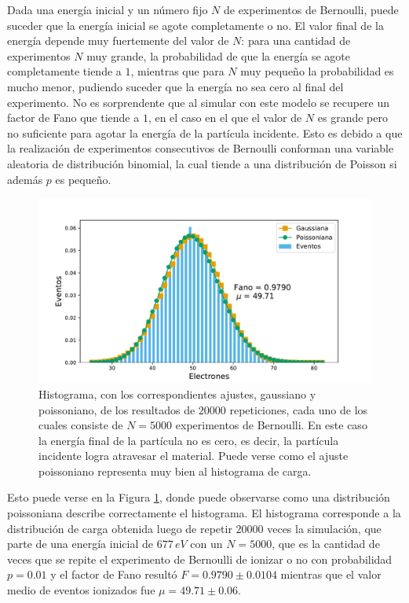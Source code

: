 Dada una energía inicial y un número fijo $N$ de experimentos de Bernoulli, puede suceder que la energía inicial se agote completamente o no. El valor final de la energía depende muy fuertemente del valor de $N$: para una cantidad de experimentos $N$ muy grande, la probabilidad de que la energía se agote completamente tiende a $1$, mientras que para $N$ muy pequeño la probabilidad es mucho menor, pudiendo suceder que la energía no sea cero al final del experimento. No es sorprendente que al simular con este modelo se recupere un factor de Fano que tiende a $1$, en el caso en el que el valor de $N$ es grande pero no suficiente para agotar la energía de la partícula incidente. Esto es debido a que la realización de experimentos consecutivos de Bernoulli conforman una variable aleatoria de distribución binomial, la cual tiende a una distribución de Poisson si además $p$ es pequeño. 
\begin{figure}[h]
    \centering
    \includegraphics[scale=0.5]{Figs/Orden0_fano1.pdf}
    \caption{Histograma, con los correspondientes ajustes, gaussiano y poissoniano, de los resultados de $20000$ repeticiones, cada uno de los cuales consiste de $N = 5000$ experimentos de Bernoulli. En este caso la energía final de la partícula no es cero, es decir, la partícula incidente logra atravesar el material. Puede verse como el ajuste poissoniano representa muy bien al histograma de carga.}
    \label{fig:SimulacionOrden0Fano1}
\end{figure}
Esto puede verse en la Figura \ref{fig:SimulacionOrden0Fano1}, donde puede observarse como una distribución poissoniana describe correctamente el histograma. El histograma corresponde a la distribución de carga obtenida luego de repetir $20000$ veces la simulación, que parte de una energía inicial de $677\,\si{eV}$ con un $N = 5000$, que es la cantidad de veces que se repite el experimento de Bernoulli de ionizar o no con probabilidad $p=0.01$ y el factor de Fano resultó $F = 0.9790 \pm 0.0104$ mientras que el valor medio de eventos ionizados fue $\mu = 49.71 \pm 0.06$.

